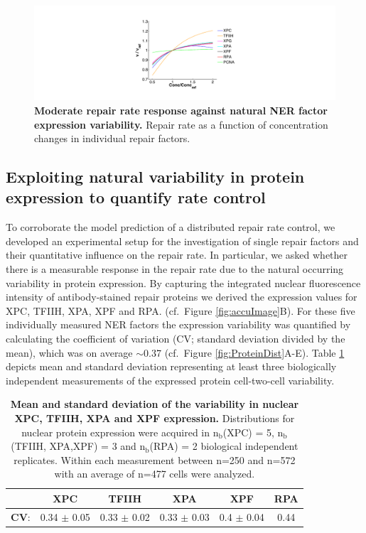\begin{figure}[htbp]
	\begin{center}
		\includegraphics[width=1\textwidth]{Abbildungen/figure3_1_b.pdf}
		\caption{\textbf{Moderate repair rate response against natural NER factor expression variability.} Repair rate as a function of concentration changes in individual repair factors.}
		\label{fig:R_largeProteinVariation}
	\end{center}
\end{figure}

\subsection{Exploiting natural variability in protein expression to quantify rate control}
\label{natural_Variability_m}
To corroborate the model prediction of a distributed repair rate control, we developed an experimental setup for the investigation of single repair factors and their quantitative influence on the repair rate. In particular, we asked whether there is a measurable response in the repair rate due to the natural occurring variability in protein expression. By capturing the integrated nuclear fluorescence intensity of antibody-stained repair proteins we derived the expression values for XPC, TFIIH, XPA, XPF and RPA. (cf.\ Figure \ref{fig:accuImage}B). For these five individually measured NER factors the expression variability was quantified by calculating the coefficient of variation (CV; standard deviation divided by the mean), which was on average $\sim$0.37 (cf.\ Figure \ref{fig:ProteinDist}A-E). Table \ref{tab:proteinVariability} depicts mean and standard deviation representing at least three biologically independent measurements of the expressed protein cell-two-cell variability.

\begin{table}[h!]
	\centering
	\begin{tabular}{cccccc}
		\hline
		\rule{0pt}{2ex}
		&\textbf{XPC} & \textbf{TFIIH} & \textbf{XPA} & \textbf{XPF} & \textbf{RPA}\\ \hline
		\rule{0pt}{3ex}
		\textbf{CV}: & 0.34 $\pm$ 0.05 & 0.33 $\pm$ 0.02 & 0.33 $\pm$ 0.03 & 0.4 $\pm$ 0.04 & 0.44\\ \hline
		
	\end{tabular}
	\caption{\textbf{Mean and standard deviation of the variability in nuclear XPC, TFIIH, XPA and XPF expression.} Distributions for nuclear protein expression were acquired in $\text{n}_\text{b}$(XPC) = 5, $\text{n}_\text{b}$(TFIIH, XPA,XPF) = 3 and $\text{n}_\text{b}$(RPA) = 2 biological independent replicates. Within each measurement between n=250 and n=572 with an average of n=477 cells were analyzed.}\label{tab:proteinVariability}
\end{table}      


